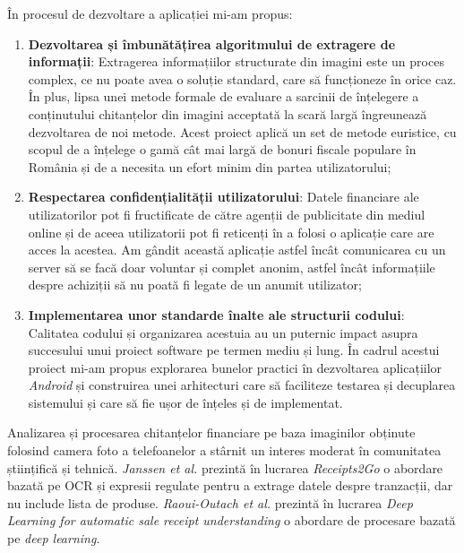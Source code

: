 În procesul de dezvoltare a aplicației \AppName{} mi-am propus:
\begin{enumerate}
  \item 
  \textbf{Dezvoltarea și îmbunătățirea algoritmului de extragere de informații}: Extragerea informațiilor structurate din imagini este un proces complex, ce nu poate avea o soluție standard, care să funcționeze în orice caz. În plus, lipsa unei metode formale de evaluare a sarcinii de înțelegere a conținutului chitanțelor din imagini acceptată la scară largă îngreunează dezvoltarea de noi metode. Acest proiect aplică un set de metode euristice, cu scopul de a înțelege o gamă cât mai largă de bonuri fiscale populare în România și de a necesita un efort minim din partea utilizatorului;
  \item
  \textbf{Respectarea confidențialității utilizatorului}: Datele financiare ale utilizatorilor pot fi fructificate de către agenții de publicitate din mediul online și de aceea utilizatorii pot fi reticenți în a folosi o aplicație care are acces la acestea. Am gândit această aplicație astfel încât comunicarea cu un server să se facă doar voluntar și complet anonim, astfel încât informațiile despre achiziții să nu poată fi legate de un anumit utilizator;
  \item
  \textbf{Implementarea unor standarde înalte ale structurii codului}: Calitatea codului și organizarea acestuia au un puternic impact asupra succesului unui proiect software pe termen mediu și lung. În cadrul acestui proiect mi-am propus explorarea bunelor practici în dezvoltarea aplicațiilor \emph{Android} și construirea unei arhitecturi care să faciliteze testarea și decuplarea sistemului și care să fie ușor de înțeles și de implementat.
\end{enumerate}


Analizarea și procesarea chitanțelor financiare pe baza imaginilor obținute folosind camera foto a telefoanelor a stârnit un interes moderat în comunitatea științifică și tehnică. \emph{Janssen et al.} prezintă în lucrarea \emph{Receipts2Go} \cite{Receipts2Go} o abordare bazată pe OCR și expresii regulate pentru a extrage datele despre tranzacții, dar nu include lista de produse. \emph{Raoui-Outach et al.} prezintă în lucrarea \emph{Deep Learning for automatic sale receipt understanding} \cite{DL_receipt_understanding} o abordare de procesare bazată pe \emph{deep learning}.


